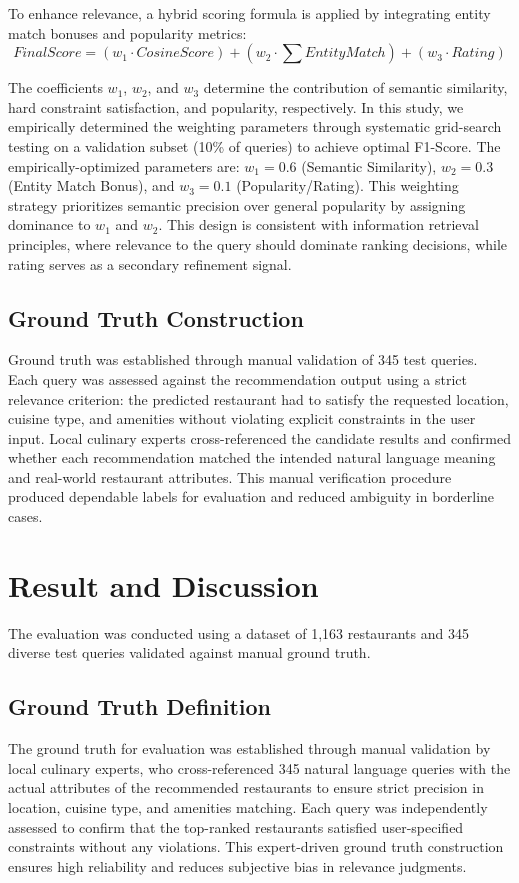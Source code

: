 \documentclass[conference]{IEEEtran}
\begin{document}
To enhance relevance, a hybrid scoring formula is applied by integrating entity match bonuses and popularity metrics\cite{b6,b8,b10}:
\begin{equation}
FinalScore = (w_1 \cdot CosineScore) + (w_2 \cdot \sum EntityMatch) + (w_3 \cdot Rating)
\end{equation}

The coefficients $w_1$, $w_2$, and $w_3$ determine the contribution of semantic similarity, hard constraint satisfaction, and popularity, respectively. In this study, we empirically determined the weighting parameters through systematic grid-search testing on a validation subset (10\% of queries) to achieve optimal F1-Score. The empirically-optimized parameters are: $w_1 = 0.6$ (Semantic Similarity), $w_2 = 0.3$ (Entity Match Bonus), and $w_3 = 0.1$ (Popularity/Rating). This weighting strategy prioritizes semantic precision over general popularity by assigning dominance to $w_1$ and $w_2$. This design is consistent with information retrieval principles, where relevance to the query should dominate ranking decisions, while rating serves as a secondary refinement signal\cite{b6,b8,b10,b11}.

\subsection{Ground Truth Construction}
Ground truth was established through manual validation of 345 test queries\cite{b16}. Each query was assessed against the recommendation output using a strict relevance criterion: the predicted restaurant had to satisfy the requested location, cuisine type, and amenities without violating explicit constraints in the user input. Local culinary experts cross-referenced the candidate results and confirmed whether each recommendation matched the intended natural language meaning and real-world restaurant attributes\cite{b16,b8,b14}. This manual verification procedure produced dependable labels for evaluation and reduced ambiguity in borderline cases\cite{b6,b11}.

\section{Result and Discussion}
The evaluation was conducted using a dataset of 1,163 restaurants and 345 diverse test queries validated against manual ground truth\cite{b16}.

\subsection{Ground Truth Definition}
The ground truth for evaluation was established through manual validation by local culinary experts, who cross-referenced 345 natural language queries with the actual attributes of the recommended restaurants to ensure strict precision in location, cuisine type, and amenities matching. Each query was independently assessed to confirm that the top-ranked restaurants satisfied user-specified constraints without any violations. This expert-driven ground truth construction ensures high reliability and reduces subjective bias in relevance judgments\cite{b6,b12}.
\end{document}
